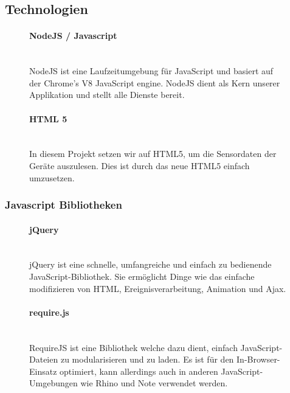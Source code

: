 \documentclass[a4paper]{spie}  %
\begin{document}
\subsection{Technologien} %
\begin{figure}[H]
\begin{minipage}[t]{0.4\textwidth}
\vspace{0pt}
\paragraph{NodeJS / Javascript}\mbox{}\\
NodeJS ist eine Laufzeitumgebung für JavaScript und basiert auf der Chrome's V8 JavaScript engine. NodeJS dient als Kern unserer Applikation und stellt alle Dienste bereit.

\end{minipage}
\hfill
\begin{minipage}[t]{0.5\textwidth}
\vspace{0pt}
\paragraph{HTML 5}\mbox{}\\
In diesem Projekt setzen wir auf HTML5, um die Sensordaten der Geräte auszulesen. Dies ist durch das neue HTML5 einfach umzusetzen.
\end{minipage}
\end{figure}

\subsubsection{Javascript Bibliotheken}

\begin{figure}[H]
\begin{minipage}[t]{0.4\textwidth}
\vspace{0pt}
\paragraph{jQuery}\mbox{}\\
jQuery ist eine schnelle, umfangreiche und einfach zu bedienende JavaScript-Bibliothek. Sie ermöglicht Dinge wie das einfache modifizieren von HTML, Ereignisverarbeitung, Animation und Ajax.
\end{minipage}
\hfill
\begin{minipage}[t]{0.5\textwidth}
\vspace{0pt}
\paragraph{require.js}\mbox{}\\
RequireJS ist eine Bibliothek welche dazu dient, einfach JavaScript-Dateien zu modularisieren und zu laden. Es ist für den In-Browser-Einsatz optimiert, kann allerdings auch in anderen JavaScript-Umgebungen wie Rhino und Note verwendet werden.
\end{minipage}
\end{figure}
\end{document}
